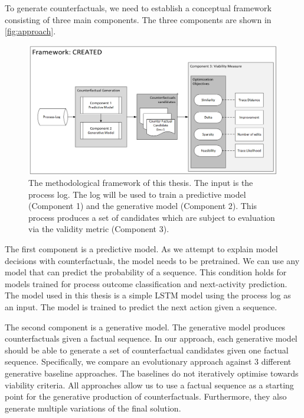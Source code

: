 \documentclass[./../../paper.tex]{subfiles}
\begin{document}
To generate counterfactuals, we need to establish a conceptual framework consisting of three main components. The three components are shown in \autoref{fig:approach}. 

\begin{figure}[htb]
    \centering
    \includegraphics[width=0.99\textwidth]{figures/framework.png}
    \caption{The methodological framework of this thesis. The input is the process log. The log will be used to train a predictive model (Component 1) and the generative model (Component 2). This process produces a set of candidates which are subject to evaluation via the validity metric (Component 3).}
    \label{fig:approach}
\end{figure}

The first component is a predictive model. As we attempt to explain model decisions with counterfactuals, the model needs to be pretrained. We can use any model that can predict the probability of a sequence. This condition holds for models trained for process outcome classification and next-activity prediction. The model used in this thesis is a simple LSTM model using the process log as an input. The model is trained to predict the next action given a sequence. 

The second component is a generative model. The generative model produces counterfactuals given a factual sequence. In our approach, each generative model should be able to generate a set of counterfactual candidates given one factual sequence. Specifically, we compare an evolutionary approach against 3 different generative baseline approaches. The baselines do not iteratively optimise towards viability criteria. All approaches allow us to use a factual sequence as a starting point for the generative production of counterfactuals. Furthermore, they also generate multiple variations of the final solution. 
\end{document}

